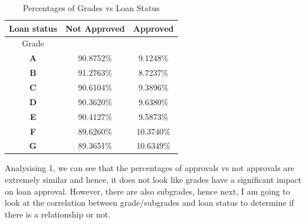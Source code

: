 \documentclass[sigplan]{acmart}
\begin{document}
\begin{table}[h]
    \centering
    \caption{Percentages of Grades vs Loan Status}
    \label{tab:percentage of grades vs loan status}
    \begin{tabular}{|c|c|c|}
        \hline
        Loan status & Not Approved & Approved  \\
        \hline
        Grade       &              &           \\
        \hline
        \textbf{A}  & 90.8752\%    & 9.1248\%  \\
        \hline
        \textbf{B}  & 91.2763\%    & 8.7237\%  \\
        \hline
        \textbf{C}  & 90.6104\%    & 9.3896\%  \\
        \hline
        \textbf{D}  & 90.3620\%    & 9.6380\%  \\
        \hline
        \textbf{E}  & 90.4127\%    & 9.5873\%  \\
        \hline
        \textbf{F}  & 89.6260\%    & 10.3740\% \\
        \hline
        \textbf{G}  & 89.3651\%    & 10.6349\% \\
        \hline
    \end{tabular}
\end{table}

Analysising \tablename{ 1}, we can see that the percentages of approvals vs not approvals are extremely similar and hence,
it does not look like grades have a significant impact on loan approval. However, there are also subgrades, hence next, I am going to look at the
correlation between grade/subgrades and loan status to determine if there is a relationship or not.
\end{document}
